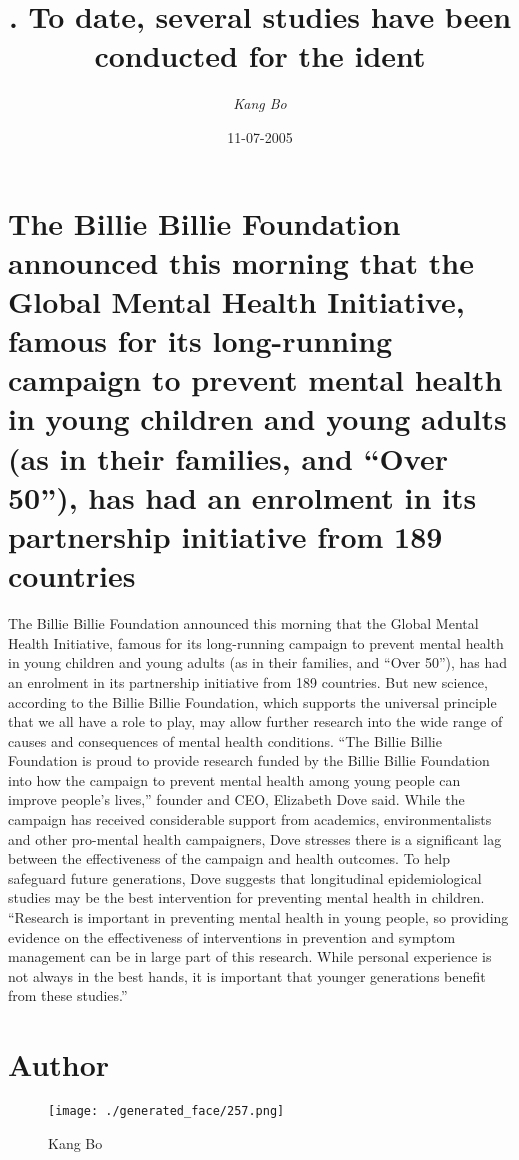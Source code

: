 \documentclass{article}%
\title{. To date, several studies have been conducted for the ident}%
\author{\textit{Kang Bo}}%
\date{11-07-2005}%
\begin{document}
%
\normalsize%
\maketitle%
\section{The Billie Billie Foundation announced this morning that the Global Mental Health Initiative, famous for its long{-}running campaign to prevent mental health in young children and young adults (as in their families, and “Over 50”), has had an enrolment in its partnership initiative from 189 countries}%
\label{sec:TheBillieBillieFoundationannouncedthismorningthattheGlobalMentalHealthInitiative,famousforitslong{-}runningcampaigntopreventmentalhealthinyoungchildrenandyoungadults(asintheirfamilies,andOver50),hashadanenrolmentinitspartnershipinitiativefrom189countries}%
The Billie Billie Foundation announced this morning that the Global Mental Health Initiative, famous for its long{-}running campaign to prevent mental health in young children and young adults (as in their families, and “Over 50”), has had an enrolment in its partnership initiative from 189 countries.\newline%
But new science, according to the Billie Billie Foundation, which supports the universal principle that we all have a role to play, may allow further research into the wide range of causes and consequences of mental health conditions.\newline%
“The Billie Billie Foundation is proud to provide research funded by the Billie Billie Foundation into how the campaign to prevent mental health among young people can improve people’s lives,” founder and CEO, Elizabeth Dove said.\newline%
While the campaign has received considerable support from academics, environmentalists and other pro{-}mental health campaigners, Dove stresses there is a significant lag between the effectiveness of the campaign and health outcomes.\newline%
To help safeguard future generations, Dove suggests that longitudinal epidemiological studies may be the best intervention for preventing mental health in children.\newline%
“Research is important in preventing mental health in young people, so providing evidence on the effectiveness of interventions in prevention and symptom management can be in large part of this research. While personal experience is not always in the best hands, it is important that younger generations benefit from these studies.”\newline%

%
\section{Author}%
\label{sec:Author}%


\begin{figure}[h!]%
\centering%
\texttt{[image: ./generated\_face/257.png]}%
\caption{Kang Bo}%
\end{figure}

%
\end{document}
